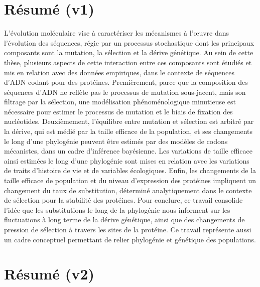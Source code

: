 \thispagestyle{empty}

\section*{Résumé (v1)}

L'évolution moléculaire vise à caractériser les mécanismes à l'œuvre dans l'évolution des séquences, régie par un processus stochastique dont les principaux composants sont la mutation, la sélection et la dérive génétique.
Au sein de cette thèse, plusieurs aspects de cette interaction entre ces composants sont étudiés et mis en relation avec des données empiriques, dans le contexte de séquences d'ADN codant pour des protéines.
Premièrement, parce que la composition des séquences d'ADN ne reflète pas le processus de mutation sous-jacent, mais son filtrage par la sélection, une modélisation phénoménologique minutieuse est nécessaire pour estimer le processus de mutation et le biais de fixation des nucléotides.
Deuxièmement, l'équilibre entre mutation et sélection est arbitré par la dérive, qui est médié par la taille efficace de la population, et ses changements le long d'une phylogénie peuvent être estimés par des modèles de codons mécanistes, dans un cadre d'inférence bayésienne.
Les variations de taille efficace ainsi estimées le long d'une phylogénie sont mises en relation avec les variations de traits d'histoire de vie et de variables écologiques.
Enfin, les changements de la taille efficace de population et du niveau d'expression des protéines impliquent un changement du taux de substitution, déterminé analytiquement dans le contexte de sélection pour la stabilité des protéines.
Pour conclure, ce travail consolide l'idée que les substitutions le long de la phylogénie nous informent sur les fluctuations à long terme de la dérive génétique, ainsi que des changements de pression de sélection à travers les sites de la protéine.
Ce travail représente aussi un cadre conceptuel permettant de relier phylogénie et génétique des populations.

\section*{Résumé (v2)}

